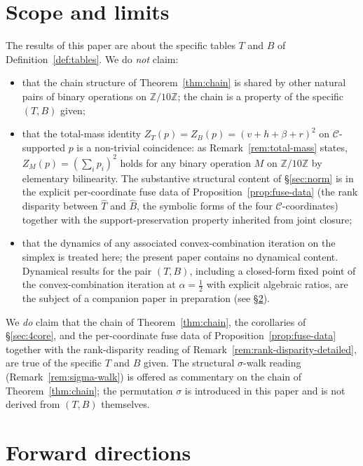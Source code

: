 \documentclass[11pt,reqno]{amsart}
\theoremstyle{plain}
\theoremstyle{definition}
\theoremstyle{remark}
\newcommand{\Z}{\mathbb{Z}}
\newcommand{\Zten}{\Z/10\Z}
\newcommand{\Cfour}{\mathcal{C}}
\newcommand{\Tfuse}{\widehat{T}}
\newcommand{\Bfuse}{\widehat{B}}
\begin{document}
\section{Scope and limits}\label{sec:scope}

The results of this paper are about the specific tables $T$ and
$B$ of Definition~\ref{def:tables}. We do \emph{not} claim:
\begin{itemize}\setlength\itemsep{0pt}
\item that the chain structure of Theorem~\ref{thm:chain} is
shared by other natural pairs of binary operations on $\Zten$;
the chain is a property of the specific $(T, B)$ given;
\item that the total-mass identity
$Z_{T}(p) = Z_{B}(p) = (v + h + \beta + r)^{2}$ on
$\Cfour$-supported $p$ is a non-trivial coincidence: as
Remark~\ref{rem:total-mass} states, $Z_{M}(p) = (\sum_{i}p_{i})^{2}$
holds for any binary operation $M$ on $\Zten$ by elementary
bilinearity. The substantive structural content of
\S\ref{sec:norm} is in the explicit per-coordinate fuse data of
Proposition~\ref{prop:fuse-data} (the rank disparity between
$\Tfuse$ and $\Bfuse$, the symbolic forms of the four
$\Cfour$-coordinates) together with the support-preservation
property inherited from joint closure;
\item that the dynamics of any associated convex-combination
iteration on the simplex is treated here; the present paper
contains no dynamical content. Dynamical results for the pair
$(T, B)$, including a closed-form fixed point of the
convex-combination iteration at $\alpha = \tfrac{1}{2}$ with
explicit algebraic ratios, are the subject of a companion paper
in preparation (see \S\ref{sec:forward}).
\end{itemize}

We \emph{do} claim that the chain of Theorem~\ref{thm:chain},
the corollaries of \S\ref{sec:4core}, and the per-coordinate
fuse data of Proposition~\ref{prop:fuse-data} together with the
rank-disparity reading of
Remark~\ref{rem:rank-disparity-detailed}, are true of the
specific $T$ and $B$ given. The structural
$\sigma$-walk reading (Remark~\ref{rem:sigma-walk}) is offered
as commentary on the chain of
Theorem~\ref{thm:chain}; the permutation $\sigma$ is introduced
in this paper and is not derived from $(T, B)$ themselves.

\section{Forward directions}\label{sec:forward}
\end{document}
